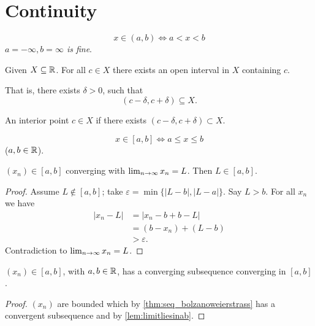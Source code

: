 \chapter{Continuity}\label{cha:continuity}

\begin{definition}\label{def:openinterval}
    \[
    x \in (a, b) \iff a < x < b
    \]
    \textit{$a = -\infty, b = \infty$ is fine}.
\end{definition}

\begin{definition}\label{def:openset}
    Given $X \subseteq \mathbb{R}$. For all $c \in X$ there exists an open interval in $X$ containing $c$.
    
    That is,
    there exists $\delta > 0$,
    such that
    \[
    (c - \delta, c + \delta) \subseteq X.
    \]
\end{definition}

\begin{definition}\label{def:interiorpoint}
    An interior point $c \in X$ if there exists $(c - \delta, c + \delta) \subset X$.
\end{definition}

\begin{definition}\label{def:closedinterval}
    \[
    x \in [a, b] \iff a \leq x \leq b
    \]
    ($a, b \in \mathbb{R}$).
\end{definition}

\begin{lemma}\label{lem:limitliesinab}
    $(x_n) \in [a, b]$ converging with $\lim_{n \rightarrow \infty} x_n = L$.
    Then $L \in [a, b]$.
\end{lemma}
\begin{proof}
    Assume $L \notin [a, b]$;
    take $\varepsilon = \min\{|L - b|, |L - a|\}$.
    Say $L > b$.
    For all $x_n$ we have
    \begin{align*}
        |x_n - L| &= |x_n - b + b - L| \\
        &= (b - x_n) + (L - b) \\
        &> \varepsilon.
    \end{align*}
    Contradiction to $\lim_{n \rightarrow \infty} x_n = L$.
\end{proof}

\begin{theorem}\label{thm:cont_bolzanoweierstrass}
    $(x_n) \in [a, b]$,
    with $a, b \in \mathbb{R}$,
    has a converging subsequence converging in $[a, b]$.
\end{theorem}
\begin{proof}
    $(x_n)$ are bounded which by \autoref{thm:seq_bolzanoweierstrass} has a convergent subsequence and by \autoref{lem:limitliesinab}.
\end{proof}

